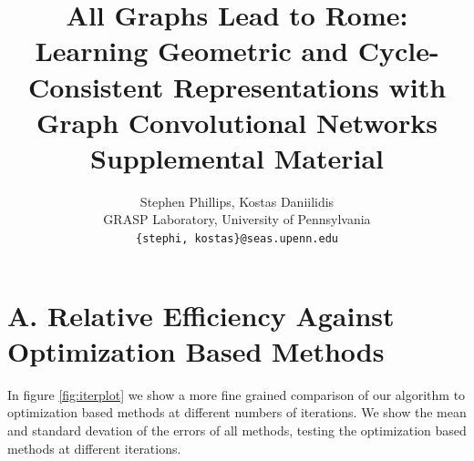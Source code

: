 \documentclass[10pt,twocolumn,letterpaper]{article}
\begin{document}
\title{All Graphs Lead to Rome: Learning Geometric and Cycle-Consistent Representations with Graph Convolutional Networks \\
Supplemental Material}

\author{Stephen Phillips, Kostas Daniilidis \\
GRASP Laboratory, University of Pennsylvania\\
{\tt\small \{stephi, kostas\}@seas.upenn.edu}
}



\maketitle

\section*{A. Relative Efficiency Against Optimization Based Methods}

In figure \ref{fig:iterplot} we show a more fine grained comparison of our algorithm to optimization based methods at different numbers of iterations.
We show the mean and standard devation of the errors of all methods, testing the optimization based methods at different iterations.
\end{document}
